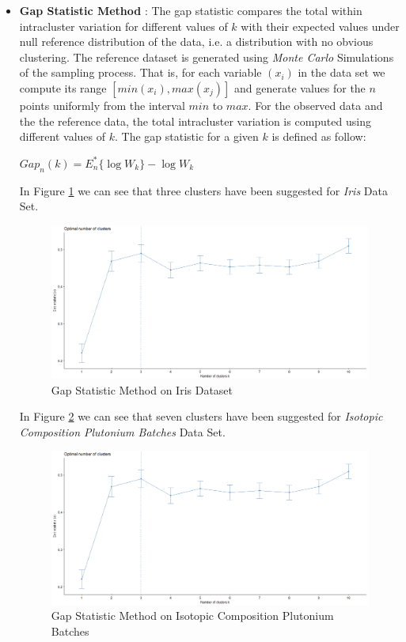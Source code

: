 \begin{itemize}
\newpage

\item \textbf{Gap Statistic Method} : The gap statistic compares the total within intracluster variation for different
values of $k$ with their expected values under null reference distribution of the data, i.e. a distribution with no
obvious clustering. The reference dataset is generated using \textit{Monte Carlo} Simulations of the sampling process.
That is, for each variable $(x_i)$ in the data set we compute its range $[min(x_i),max(x_j)]$ and generate values
for the $n$ points uniformly from the interval $min$ to $max$. For the observed data and the the reference data, the total
intracluster variation is computed using different values of $k$. The gap statistic for a given $k$ is defined as follow:

$Gap_n(k) = E_n^{*}\{\log W_k\} - \log W_k$

\vspace{15mm}

In Figure \ref{fig:gap1} we can see that three clusters have been suggested for \textit{Iris} Data Set.

\begin{figure}[h!]
  \centering
  \includegraphics[scale=1.3]{figures/results/iris/gap.png}
  \caption{Gap Statistic Method on Iris Dataset}
  \label{fig:gap1}
\end{figure}

\newpage

In Figure \ref{fig:gap2} we can see that seven clusters have been suggested for \textit{Isotopic Composition Plutonium Batches} Data Set.

\begin{figure}[h!]
  \centering
  \includegraphics[scale=1.3]{figures/results/pluton/gap.png}
  \caption{Gap Statistic Method on Isotopic Composition Plutonium Batches}
  \label{fig:gap2}
\end{figure}


\end{itemize}
